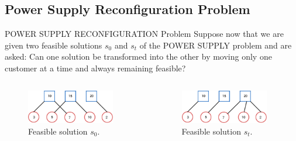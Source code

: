 \subsection{Power Supply Reconfiguration Problem}
\begin{frame}{POWER SUPPLY RECONFIGURATION Problem}
Suppose now that we are given two feasible solutions $s_0$ and $s_t$ of the POWER SUPPLY problem and are asked: Can one solution be transformed into the other by moving only one customer at a time and always remaining feasible?
\pause
\begin{columns}
    \begin{column}{0.5\textwidth}
        \begin{figure}
        \centering
        \includegraphics[width=0.9\textwidth]{img/ps2.pdf}
        \caption{Feasible solution $s_0$.}
        \label{fig:circle}
        \end{figure}
    \end{column}
    \begin{column}{0.5\textwidth}
        \begin{figure}
        \centering
        \includegraphics[width=0.9\textwidth]{img/ps4.pdf}
        \caption{Feasible solution $s_t$.}
        \label{fig:circle}
        \end{figure}
    \end{column}
\end{columns}

\end{frame}

